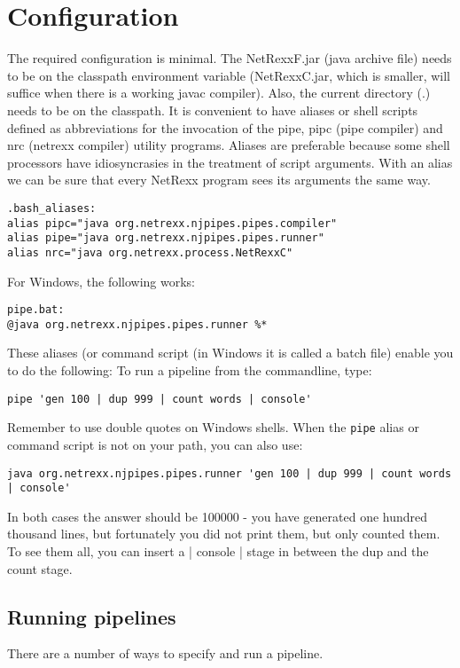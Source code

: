\section{Configuration}
The required configuration is minimal. The NetRexxF.jar (java archive
file) needs to be on the classpath environment variable (NetRexxC.jar, which is smaller, will suffice when there is a working javac compiler). Also, the current directory (.) needs to be on the classpath.
It is convenient to have aliases or shell scripts defined as abbreviations for the invocation of the pipe, pipc (pipe compiler) and nrc (netrexx compiler) utility programs. 
Aliases are preferable because some shell processors have
idiosyncrasies in the treatment of script arguments. With an alias we
can be sure that every NetRexx program sees its arguments the same
way.
\begin{verbatim}
.bash_aliases:
alias pipc="java org.netrexx.njpipes.pipes.compiler"
alias pipe="java org.netrexx.njpipes.pipes.runner"
alias nrc="java org.netrexx.process.NetRexxC"
\end{verbatim}
For Windows, the following works:
\begin{verbatim}
pipe.bat:
@java org.netrexx.njpipes.pipes.runner %*
\end{verbatim}
These aliases (or command script (in Windows it is called a batch
file) enable you to do the following:
 To run a pipeline from the commandline, type:
\begin{lstlisting}
pipe 'gen 100 | dup 999 | count words | console'
\end{lstlisting}

Remember to use double quotes on Windows shells. When the \texttt{pipe}
alias or command script is not on your path, you can also use:

\begin{lstlisting}
java org.netrexx.njpipes.pipes.runner 'gen 100 | dup 999 | count words | console'
\end{lstlisting}

In both cases the answer should be 100000 - you have generated one
hundred thousand lines, but fortunately you did not print them, but
only counted them. To see them all, you can insert a | console | stage
in between the dup and the count stage.

\subsection{Running pipelines}
There are a number of ways to specify and run a pipeline.
